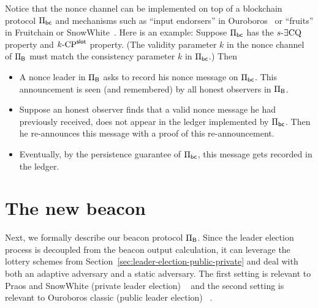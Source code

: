 Notice that the nonce channel can be implemented 
on top of a blockchain protocol $\Pi_\mathsf{bc}$ 
and mechanisms such as ``input endorsers'' in Ouroboros~\cite{Ouroboros} 
or ``fruits'' in Fruitchain or SnowWhite~\cite{Fruitchains,SnowWhite}.
Here is an example: 
Suppose $\Pi_\mathsf{bc}$ has the ${s}\text{-}\exists\mathrm{CQ}$ property and ${k}\text{-}\mathrm{CP}^{\mathsf{slot}}$ property. 
(The validity parameter $k$ in the nonce channel of $\Pi_{\mathsf{B}}$ 
must match the consistency parameter $k$ in $\Pi_\mathsf{bc}$.)
Then
\begin{itemize}
  \item A nonce leader in $\Pi_{\mathsf{B}}$ asks to record his nonce message on $\Pi_\mathsf{bc}$.
  This announcement is seen (and remembered) by all honest observers in $\Pi_{\mathsf{B}}$.
  
  \item Suppose an honest observer finds that a valid nonce message he had previously received, 
  does not appear in the ledger implemented by $\Pi_\mathsf{bc}$. 
  Then he re-announces this message with a proof of this re-announcement.

  \item Eventually, by the persistence guarantee of $\Pi_\mathsf{bc}$, 
  this message gets recorded in the ledger.
\end{itemize}
\noindent




\newcommand{\PublicElectionDistribution}{\hat{\mathcal{L}}}
\newcommand{\PrivateElectionDistribution}{\mathcal{L}}






\section{The new beacon}

Next, we formally describe our beacon protocol $\Pi_{\mathsf{B}}$. 
Since the leader election process 
is decoupled from the beacon output calculation, 
it can leverage the lottery schemes from Section~\ref{sec:leader-election-public-private}
and deal with both an adaptive adversary 
and a static adversary. 
The first setting is relevant to Praos and SnowWhite (private leader election) ~\cite{Praos,SnowWhite} 
and the second setting 
is relevant to Ouroboros classic (public leader election) ~\cite{Ouroboros}. 




